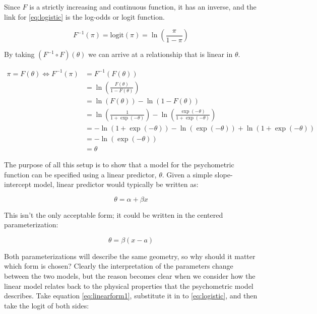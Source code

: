 \documentclass[11pt, oneside, openany]{scrbook}
\begin{document}
Since \(F\) is a strictly increasing and continuous function, it has an inverse, and the link for \eqref{eq:logistic} is the log-odds or logit function.

\begin{equation}
  F^{-1}(\pi) = \mathrm{logit}(\pi) = \ln\left(\frac{\pi}{1 - \pi}\right)
  \label{eq:logit}
\end{equation}

By taking \((F^{-1} \circ F)(\theta)\) we can arrive at a relationship that is linear in \(\theta\).

\begin{align*}
  \pi = F(\theta) \Longleftrightarrow F^{-1}(\pi) &= F^{-1}(F(\theta)) \\
  & = \ln\left(\frac{F(\theta)}{1 - F(\theta)}\right) \\
  &= \ln(F(\theta)) - \ln(1 - F(\theta)) \\
  &= \ln\left(\frac{1}{1 + \exp(-\theta)}\right) - \ln\left(\frac{\exp(-\theta)}{1 + \exp(-\theta)}\right) \\
  &= - \ln(1 + \exp(-\theta)) - \ln(\exp(-\theta)) + \ln(1 + \exp(-\theta)) \\
  &= - \ln(\exp(-\theta)) \\
  &= \theta
\end{align*}

The purpose of all this setup is to show that a model for the psychometric function can be specified using a linear predictor, \(\theta\). Given a simple slope-intercept model, linear predictor would typically be written as:

\begin{equation}
  \theta = \alpha + \beta x
  \label{eq:linearform1}
\end{equation}

This isn't the only acceptable form; it could be written in the centered parameterization:

\begin{equation}
  \theta = \beta(x - a)
  \label{eq:linearform2}
\end{equation}

Both parameterizations will describe the same geometry, so why should it matter which form is chosen? Clearly the interpretation of the parameters change between the two models, but the reason becomes clear when we consider how the linear model relates back to the physical properties that the psychometric model describes. Take equation \eqref{eq:linearform1}, substitute it in to \eqref{eq:logistic}, and then take the logit of both sides:
\end{document}
